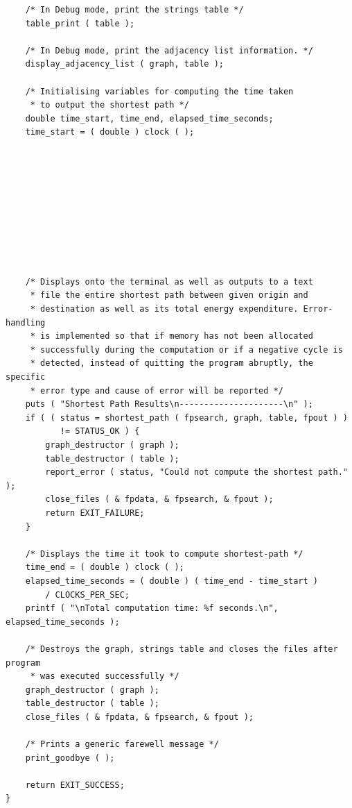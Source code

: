 \documentclass[11pt]{article}
\begin{document}
\begin{verbatim}
    /* In Debug mode, print the strings table */
    table_print ( table );

    /* In Debug mode, print the adjacency list information. */
    display_adjacency_list ( graph, table );

    /* Initialising variables for computing the time taken
     * to output the shortest path */
    double time_start, time_end, elapsed_time_seconds;
    time_start = ( double ) clock ( );










    /* Displays onto the terminal as well as outputs to a text
     * file the entire shortest path between given origin and
     * destination as well as its total energy expenditure. Error-handling
     * is implemented so that if memory has not been allocated
     * successfully during the computation or if a negative cycle is
     * detected, instead of quitting the program abruptly, the specific
     * error type and cause of error will be reported */
    puts ( "Shortest Path Results\n---------------------\n" );
    if ( ( status = shortest_path ( fpsearch, graph, table, fpout ) )
           != STATUS_OK ) {
        graph_destructor ( graph );
        table_destructor ( table );
        report_error ( status, "Could not compute the shortest path." );
        close_files ( & fpdata, & fpsearch, & fpout );
        return EXIT_FAILURE;
    }

    /* Displays the time it took to compute shortest-path */
    time_end = ( double ) clock ( );
    elapsed_time_seconds = ( double ) ( time_end - time_start )
        / CLOCKS_PER_SEC;
    printf ( "\nTotal computation time: %f seconds.\n", elapsed_time_seconds );

    /* Destroys the graph, strings table and closes the files after program
     * was executed successfully */
    graph_destructor ( graph );
    table_destructor ( table );
    close_files ( & fpdata, & fpsearch, & fpout );

    /* Prints a generic farewell message */
    print_goodbye ( );

    return EXIT_SUCCESS;
}
\end{verbatim}
\newpage
\end{document}
